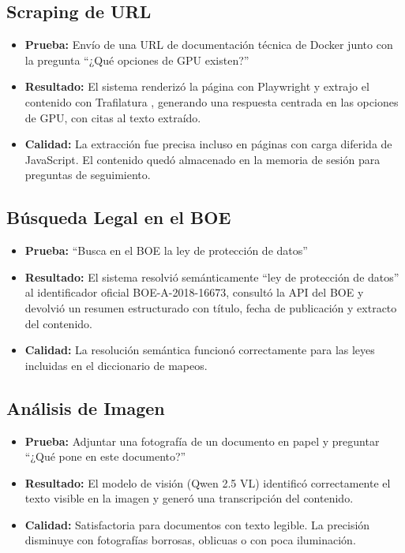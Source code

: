 \subsection{Scraping de URL}

\begin{itemize}
    \item \textbf{Prueba:} Envío de una URL de documentación técnica de Docker junto con la pregunta ``¿Qué opciones de GPU existen?''
    \item \textbf{Resultado:} El sistema renderizó la página con Playwright y extrajo el contenido con Trafilatura \cite{playwright2024docs,barbaresi2021trafilatura}, generando una respuesta centrada en las opciones de GPU, con citas al texto extraído.
    \item \textbf{Calidad:} La extracción fue precisa incluso en páginas con carga diferida de JavaScript. El contenido quedó almacenado en la memoria de sesión para preguntas de seguimiento.
\end{itemize}

\subsection{Búsqueda Legal en el BOE}

\begin{itemize}
    \item \textbf{Prueba:} ``Busca en el BOE la ley de protección de datos''
    \item \textbf{Resultado:} El sistema resolvió semánticamente ``ley de protección de datos'' al identificador oficial BOE-A-2018-16673, consultó la API del BOE y devolvió un resumen estructurado con título, fecha de publicación y extracto del contenido.
    \item \textbf{Calidad:} La resolución semántica funcionó correctamente para las leyes incluidas en el diccionario de mapeos.
\end{itemize}

\subsection{Análisis de Imagen}

\begin{itemize}
    \item \textbf{Prueba:} Adjuntar una fotografía de un documento en papel y preguntar ``¿Qué pone en este documento?''
    \item \textbf{Resultado:} El modelo de visión (Qwen 2.5 VL) identificó correctamente el texto visible en la imagen y generó una transcripción del contenido.
    \item \textbf{Calidad:} Satisfactoria para documentos con texto legible. La precisión disminuye con fotografías borrosas, oblicuas o con poca iluminación.
\end{itemize}

